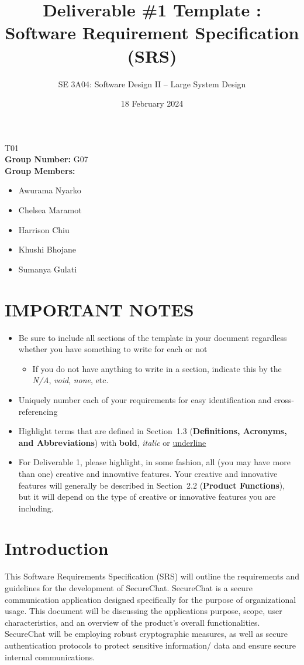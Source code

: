 \documentclass[]{article}
\title{Deliverable \#1 Template : Software Requirement Specification (SRS)}
\author{SE 3A04: Software Design II -- Large System Design}
\date{18 February 2024}
\begin{document}
\maketitle	
{} T01\\
{\bf Group Number:} G07 \\
{\bf Group Members:} 
\begin{itemize}
	\item Awurama Nyarko
	\item Chelsea Maramot
 	\item Harrison Chiu
  	\item Khushi Bhojane
   	\item Sumanya Gulati
\end{itemize}

\section*{IMPORTANT NOTES}
\begin{itemize}
	\item Be sure to include all sections of the template in your document regardless whether you have something to write for each or not
	\begin{itemize}
		\item If you do not have anything to write in a section, indicate this by the \emph{N/A}, \emph{void}, \emph{none}, etc.
	\end{itemize}
	\item Uniquely number each of your requirements for easy identification and cross-referencing
	\item Highlight terms that are defined in Section~1.3 (\textbf{Definitions, Acronyms, and Abbreviations}) with \textbf{bold}, \emph{italic} or \underline{underline}
	\item For Deliverable 1, please highlight, in some fashion, all (you may have more than one) creative and innovative features. Your creative and innovative features will generally be described in Section~2.2 (\textbf{Product Functions}), but it will depend on the type of creative or innovative features you are including.
\end{itemize}

\newpage
\section{Introduction}
\label{sec:introduction}
This Software Requirements Specification (SRS) will outline the requirements and guidelines for the development of SecureChat. SecureChat is a secure communication application designed specifically for the purpose of organizational usage. This document will be discussing the applications purpose, scope, user characteristics, and an overview of the product’s overall functionalities. SecureChat will be employing robust cryptographic measures, as well as secure authentication protocols to protect sensitive information/ data and ensure secure internal communications.
\end{document}
